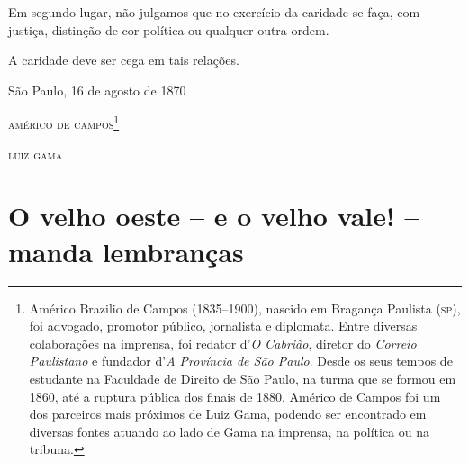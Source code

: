 Em segundo lugar, não julgamos que no exercício da caridade se faça, com
justiça, distinção de cor política ou qualquer outra ordem.

A caridade deve ser cega em tais relações.

\begin{flushright}
São Paulo, 16 de agosto de 1870

\textsc{américo de campos}\footnote{ Américo Brazilio de Campos (1835--1900),
  nascido em Bragança Paulista (\textsc{sp}), foi advogado, promotor público,
  jornalista e diplomata. Entre diversas colaborações na imprensa, foi
  redator d'\emph{O Cabrião}, diretor do \emph{Correio Paulistano} e
  fundador d'\emph{A Província de São Paulo}. Desde os seus tempos de
  estudante na Faculdade de Direito de São Paulo, na turma que se formou
  em 1860, até a ruptura pública dos finais de 1880, Américo de Campos
  foi um dos parceiros mais próximos de Luiz Gama, podendo ser
  encontrado em diversas fontes atuando ao lado de Gama na imprensa, na
  política ou na tribuna.}

\textsc{luiz gama}
\end{flushright}

\part{O velho oeste -- e o velho vale! -- manda lembranças}

